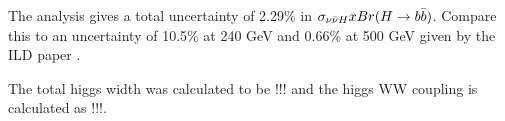 \documentclass[preprintnumbers,nofootinbib,noshowpacs,eqsecnum,prd,superscriptaddress,letterpaper]{revtex4}
\begin{document}
The analysis gives a total uncertainty of 2.29\% in $\sigma_{\nu\bar{\nu}H} x Br(H \rightarrow b\bar{b})$. Compare this to an uncertainty of 10.5\% at 240 GeV and 0.66\% at 500 GeV given by the ILD paper \cite{ILD}.

The total higgs width was calculated to be !!! and the higgs WW coupling is calculated as !!!.


\end{document}
